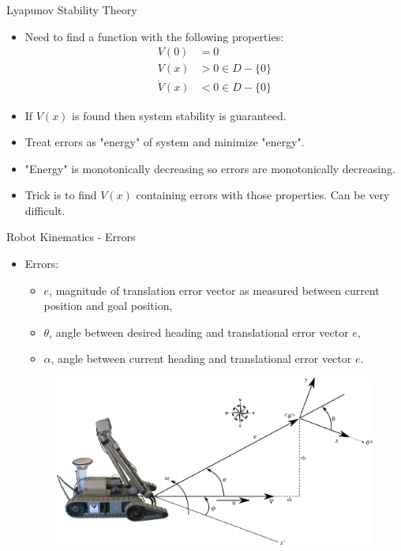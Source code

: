\documentclass[hyperref={pdfpagelabels=false}]{beamer}
\begin{document}
\begin{frame}{Lyapunov Stability Theory}
\begin{itemize}
\item Need to find a function with the following properties:
\begin{align*}
V(0) &= 0 \\
V(x) &> 0 \in D-\{0\} \\
\dot{V}(x) &< 0 \in D-\{0\}
\end{align*}
\item If $V(x)$ is found then system stability is guaranteed.
\item Treat errors as "energy" of system and minimize "energy".
\item "Energy" is monotonically decreasing so errors are monotonically decreasing.
\item Trick is to find $V(x)$ containing errors with those properties. Can be very difficult.
\end{itemize}
\end{frame}

\begin{frame}{Robot Kinematics - Errors}
\begin{itemize}
\item Errors:
\begin{itemize}
\item $e$, magnitude of translation error vector as measured between current position and goal position,
\item $\theta$, angle between desired heading and translational error vector $e$,
\item $\alpha$, angle between current heading and translational error vector $e$.
\end{itemize}

\begin{figure}[ht!]
	\centering
	\includegraphics[width=.75\textwidth]{images/packbotlyapunov}
\end{figure}

\end{itemize}
\end{frame}
\end{document}
